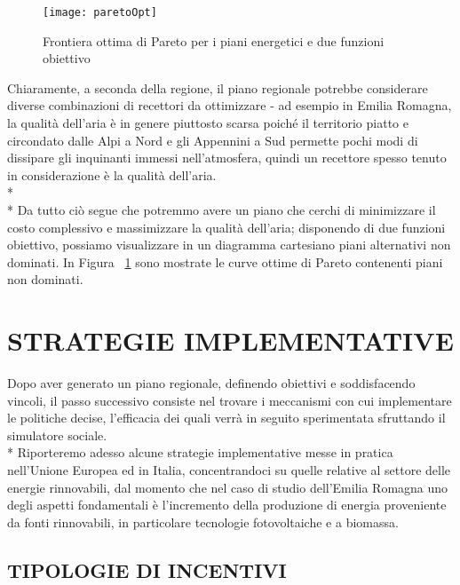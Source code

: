 \documentclass[12pt,a4paper,openright,twoside]{report}
\begin{document}
\begin{figure}[H]
	\centering
	\texttt{[image: paretoOpt]}
	\caption{Frontiera ottima di Pareto per i piani energetici e due funzioni obiettivo}
	\label{paretoOpt}
\end{figure}

Chiaramente, a seconda della regione, il piano regionale potrebbe considerare diverse combinazioni di recettori da ottimizzare - ad esempio in Emilia Romagna, la qualità dell'aria è in genere piuttosto scarsa poiché il territorio piatto e circondato dalle Alpi a Nord e gli Appennini a Sud permette pochi modi di dissipare gli inquinanti immessi nell'atmosfera, quindi un recettore spesso tenuto in considerazione è la qualità dell'aria.\\*\\*
Da tutto ciò segue che potremmo avere un piano che cerchi di minimizzare il costo complessivo e massimizzare la qualità dell'aria; disponendo di due funzioni obiettivo, possiamo visualizzare in un diagramma cartesiano piani alternativi non dominati. In Figura ~\ref{paretoOpt} sono mostrate le curve ottime di Pareto contenenti piani non dominati.

\section{\nohyphens{STRATEGIE IMPLEMENTATIVE}}
Dopo aver generato un piano regionale, definendo obiettivi e soddisfacendo vincoli, il passo successivo consiste nel trovare i meccanismi con cui implementare le politiche decise, l'efficacia dei quali verrà in seguito sperimentata sfruttando il simulatore sociale.\\*
Riporteremo adesso alcune strategie implementative messe in pratica nell'Unione Europea ed in Italia, concentrandoci su quelle relative al settore delle energie rinnovabili, dal momento che nel caso di studio dell'Emilia Romagna uno degli aspetti fondamentali è l'incremento della produzione di energia proveniente da fonti rinnovabili, in particolare tecnologie fotovoltaiche e a biomassa.

\subsection[INCENTIVI]{\nohyphens{TIPOLOGIE DI INCENTIVI}}
\end{document}

